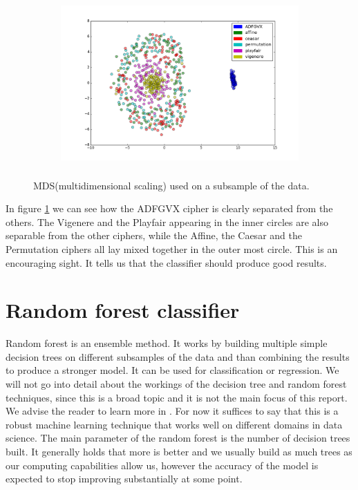 \documentclass[a4paper]{article}
\begin{document}
\begin{figure}[H]
    \centering
    \begin{subfigure}[h]{0.5\textwidth}
        \centering
        \includegraphics[height=2.5in]{img/mds_features.png}
    \end{subfigure}
    \caption{MDS(multidimensional scaling) used on a subsample of the data.}
    \label{fig:mds}
\end{figure}

In figure \ref{fig:mds} we can see how the ADFGVX cipher is clearly separated from the others. The Vigenere and the Playfair appearing in the inner circles are also separable from the other ciphers, while the Affine, the Caesar and the Permutation ciphers all lay mixed together in the outer most circle. This is an encouraging sight. It tells us that the classifier should produce good results.

\section{Random forest classifier} \label{model}
Random forest is an ensemble method. It works by building multiple simple decision trees on different subsamples of the data and than combining the results to produce a stronger model. It can be used for classification or regression. We will not go into detail about the workings of the decision tree and random forest techniques, since this is a broad topic and it is not the main focus of this report. We advise the reader to learn more in \cite{breiman2001random}. For now it suffices to say that this is a robust machine learning technique that works well on different domains in data science. The main parameter of the random forest is the number of decision trees built. It generally holds that more is better and we usually build as much trees as our computing capabilities allow us, however the accuracy of the model is expected to stop improving substantially at some point.
\end{document}
